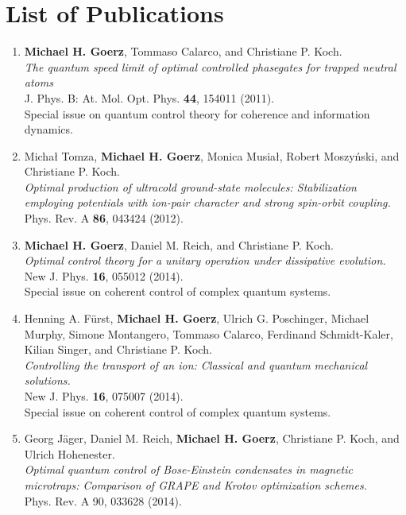 \chapter{List of Publications}
\label{AppendixPubs}

\begin{enumerate}

  \item
  {\bf Michael H. Goerz}, Tommaso Calarco, and Christiane P. Koch. \\
  {\it The quantum speed limit of optimal controlled phasegates for trapped neutral atoms} \\
  J. Phys. B: At. Mol. Opt. Phys. {\bf 44}, 154011 (2011). \\
  Special issue on quantum control theory for coherence and information dynamics.

  \item
  Michał Tomza, {\bf Michael H. Goerz}, Monica Musiał, Robert Moszyński, and Christiane P. Koch. \\
  {\it Optimal production of ultracold ground-state molecules: Stabilization employing potentials with ion-pair character and strong spin-orbit coupling.}  \\
  Phys. Rev. A {\bf 86}, 043424 (2012).

  \item
  {\bf Michael H. Goerz}, Daniel M. Reich, and Christiane P. Koch. \\
  {\it Optimal control theory for a unitary operation under dissipative evolution.} \\
  New J. Phys. {\bf 16}, 055012 (2014).  \\
  Special issue on coherent control of complex quantum systems.

  \newpage
  \item
  Henning A. Fürst, {\bf Michael H. Goerz}, Ulrich G. Poschinger, Michael Murphy, Simone Montangero, Tommaso Calarco, Ferdinand Schmidt-Kaler, Kilian Singer, and Christiane P. Koch. \\
  {\it Controlling the transport of an ion: Classical and quantum mechanical solutions.} \\
  New J. Phys. {\bf 16}, 075007 (2014). \\
  Special issue on coherent control of complex quantum systems.

  \item
  Georg Jäger, Daniel M. Reich, {\bf Michael H. Goerz}, Christiane P. Koch, and Ulrich Hohenester. \\
  {\it Optimal quantum control of Bose-Einstein condensates in magnetic microtraps: Comparison of GRAPE and Krotov optimization schemes.} \\
  Phys. Rev. A 90, 033628 (2014).


\end{enumerate}
